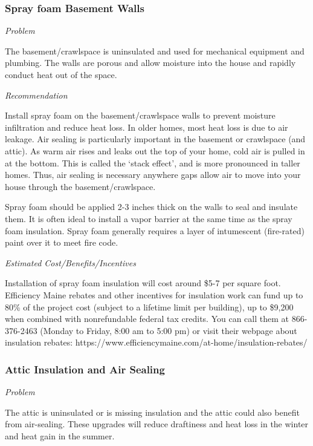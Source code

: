 \documentclass[
  letterpaper,
  DIV=11,
  numbers=noendperiod]{scrartcl}
\begin{document}
\subsubsection{Spray foam Basement
Walls}\label{spray-foam-basement-walls}

\emph{Problem}

The basement/crawlspace is uninsulated and used for mechanical equipment
and plumbing. The walls are porous and allow moisture into the house and
rapidly conduct heat out of the space.

\emph{Recommendation}

Install spray foam on the basement/crawlspace walls to prevent moisture
infiltration and reduce heat loss. In older homes, most heat loss is due
to air leakage. Air sealing is particularly important in the basement or
crawlspace (and attic). As warm air rises and leaks out the top of your
home, cold air is pulled in at the bottom. This is called the `stack
effect', and is more pronounced in taller homes. Thus, air sealing is
necessary anywhere gaps allow air to move into your house through the
basement/crawlspace.

Spray foam should be applied 2-3 inches thick on the walls to seal and
insulate them. It is often ideal to install a vapor barrier at the same
time as the spray foam insulation. Spray foam generally requires a layer
of intumescent (fire-rated) paint over it to meet fire code.

\emph{Estimated Cost/Benefits/Incentives}

Installation of spray foam insulation will cost around \$5-7 per square
foot. Efficiency Maine rebates and other incentives for insulation work
can fund up to 80\% of the project cost (subject to a lifetime limit per
building), up to \$9,200 when combined with nonrefundable federal tax
credits. You can call them at 866-376-2463 (Monday to Friday, 8:00 am to
5:00 pm) or visit their webpage about insulation rebates:
https://www.efficiencymaine.com/at-home/insulation-rebates/

\subsubsection{Attic Insulation and Air
Sealing}\label{attic-insulation-and-air-sealing}

\emph{Problem}

The attic is uninsulated or is missing insulation and the attic could
also benefit from air-sealing. These upgrades will reduce draftiness and
heat loss in the winter and heat gain in the summer.
\end{document}
